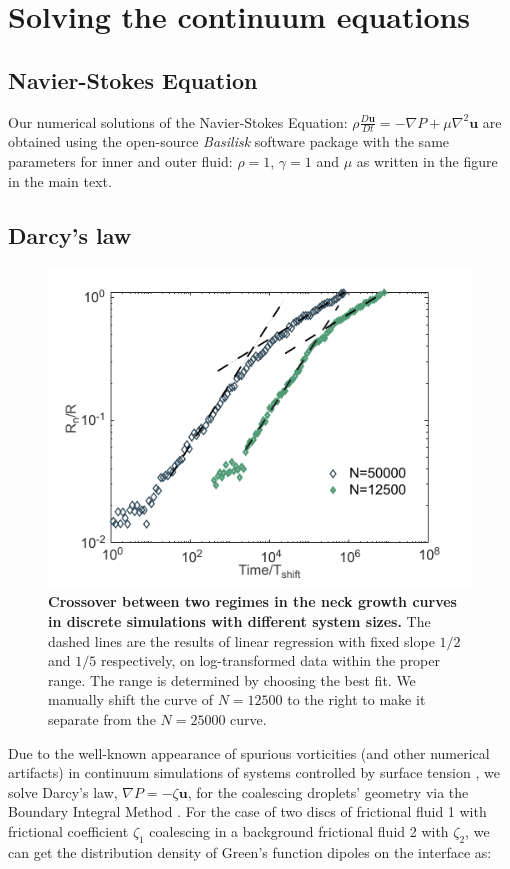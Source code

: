 \documentclass[%
reprint,
amsmath,amssymb,
aps,
]{revtex4-2}
\begin{document}
	\appendix
	\label{sec:appendix}
	\section{Solving the continuum equations}
	\subsection{Navier-Stokes Equation}
	Our numerical solutions of the Navier-Stokes Equation: $\rho\frac{D\textbf{u}}{Dt}=-\nabla P+\mu \nabla^2\textbf{u}$ are obtained using the open-source \emph{Basilisk} software package \cite{basilisk} with the same parameters for inner and outer fluid: $\rho=1$, $\gamma=1$ and $\mu$ as written in the figure in the main text.
	
	\subsection{Darcy's law}
	\begin{figure}[h]
		\centering
		\includegraphics[width=\columnwidth]{Fig_sup1.pdf}
		\caption{\textbf{Crossover between two regimes in the neck growth curves in discrete simulations with different system sizes.} The dashed lines are the results of linear regression with fixed slope $1/2$ and $1/5$ respectively, on log-transformed data within the proper range. The range is determined by choosing the best fit. We manually shift the curve of $N=12500$ to the right to make it separate from the $N=25000$ curve. }
		\label{fig:crosspoint}
	\end{figure}
	Due to the well-known appearance of spurious vorticities (and other numerical artifacts) in continuum simulations of systems controlled by surface tension  \cite{popinet2018numerical}, we solve Darcy's law, $\nabla P = -\zeta \textbf{u}$, for the coalescing droplets' geometry via the Boundary Integral Method \cite{pozrikidis2011introduction, burtonTwodimensionalInviscidPinchoff2007}. For the case of two discs of frictional fluid 1 with frictional coefficient $\zeta_1$ coalescing in a background frictional fluid 2 with $\zeta_2$, we can get the distribution density of Green's function dipoles on the interface as:
	
\end{document}
